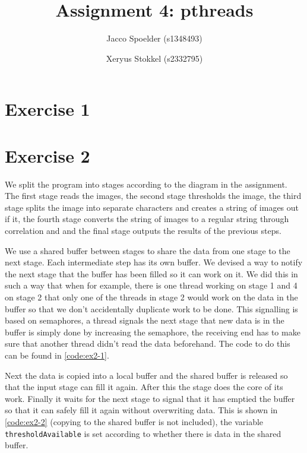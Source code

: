 \documentclass[a4paper]{article}
\title{Assignment 4: pthreads}
\author{Jacco Spoelder (s1348493) \and Xeryus Stokkel (s2332795)}
\begin{document}
\maketitle

\section{Exercise 1}

\section{Exercise 2}
We split the program into stages according to the diagram in the assignment. The first stage reads the images, the second stage thresholds the image, the third stage splits the image into separate characters and creates a string of images out if it, the fourth stage converts the string of images to a regular string through correlation and and the final stage outputs the results of the previous steps.

We use a shared buffer between stages to share the data from one stage to the next stage. Each intermediate step has its own buffer. We devised a way to notify the next stage that the buffer has been filled so it can work on it. We did this in such a way that when for example, there is one thread working on stage 1 and 4 on stage 2 that only one of the threads in stage 2 would work on the data in the buffer so that we don't accidentally duplicate work to be done. This signalling is based on semaphores, a thread signals the next stage that new data is in the buffer is simply done by increasing the semaphore, the receiving end has to make sure that another thread didn't read the data beforehand. The code to do this can be found in \autoref{code:ex2-1}.



Next the data is copied into a local buffer and the shared buffer is released so that the input stage can fill it again. After this the stage does the core of its work. Finally it waits for the next stage to signal that it has emptied the buffer so that it can safely fill it again without overwriting data. This is shown in \autoref{code:ex2-2} (copying to the shared buffer is not included), the variable \texttt{thresholdAvailable} is set according to whether there is data in the shared buffer.
\end{document}
